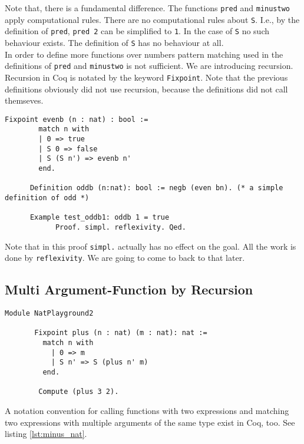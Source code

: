 	     
	  Note that, there is a fundamental difference.
	  The functions \lstinline!pred! and \lstinline!minustwo! apply computational rules. 
	  There are no computational rules about \lstinline!S!.
	  I.e., by the definition of \lstinline!pred!, \lstinline!pred 2! can be simplified to \lstinline!1!. 
	  In the case of \lstinline!S! no such behaviour exists.
	  The definition of \lstinline!S! has no behaviour at all.\\     
	  
	  In order to define more functions over numbers pattern matching used in the definitions of \lstinline!pred! and \lstinline!minustwo! is not sufficient. We are introducing recursion.
	  Recursion in Coq is notated by the keyword \lstinline!Fixpoint!. Note that the previous definitions obviously did not use recursion, because the definitions did not call themseves.
	  
	  \begin{lstlisting}[caption = \lstinline!evenb! and \lstinline!oddb!]
	  Fixpoint evenb (n : nat) : bool :=
	  	match n with
	  	| 0 => true
	  	| S 0 => false
	  	| S (S n') => evenb n'
	  	end.
	  	
	  Definition oddb (n:nat): bool := negb (even bn). (* a simple definition of odd *)
	  	
	  Example test_oddb1: oddb 1 = true
	    	Proof. simpl. reflexivity. Qed.
	  \end{lstlisting}
	   Note that in this proof \lstinline!simpl.! actually has no effect on the goal. 
	   All the work is done by \lstinline!reflexivity!. 
	   We are going to come to back to that later.

	   
   \subsection{Multi Argument-Function by Recursion}
   \label{subsec:multiArgFuncByRec}
	   
	   \begin{lstlisting}[caption = \lstinline!plus!, label=lst:plus]
	   Module NatPlayground2
	   
	   Fixpoint plus (n : nat) (m : nat): nat :=
	     match n with
	       | 0 => m
	       | S n' => S (plus n' m)
	     end.
	     
	    Compute (plus 3 2).
	   \end{lstlisting}   
	    A notation convention for calling functions with two expressions and matching two expressions with multiple arguments of the same type exist in Coq, too. 
	    See listing \ref{lst:minus_nat}.
	    
